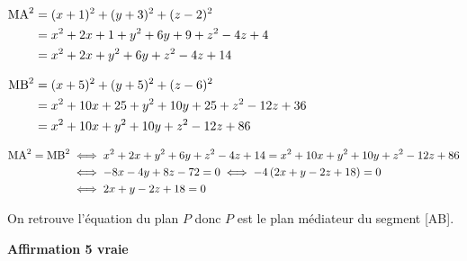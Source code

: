 \begin{enumerate}
$\aligned
\text{MA}^2 
& = (x+1)^2+(y+3)^2 + (z-2)^2\\ 
& = x^2+2x+1 + y^2+6y+9+z^2-4z+4\\
& = x^2+2x + y^2+6y+z^2-4z+14
\endaligned$

$\aligned
\text{MB}^2 
& = (x+5)^2+(y+5)^2+ (z-6)^2\\
& = x^2+10x+25 + y^2+10y +25 +z^2-12z+36\\
& = x^2+10x + y^2+10y+z^2-12z+86
\endaligned$

$\aligned
\text{MA}^2 = \text{MB}^2
& \iff x^2+2x + y^2+6y+z^2-4z+14 = x^2+10x + y^2+10y+z^2-12z+86\\
& \iff -8x -4y + 8z -72=0
\iff -4\left ( 2x +y -2z +18\right ) = 0\\
& \iff 2x+y-2z  +18 = 0
\endaligned$

On retrouve l'équation du plan $P$ donc $P$ est le plan médiateur du segment [AB].

\hfill\textbf{Affirmation 5 vraie}
	\end{enumerate}
